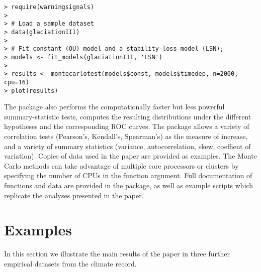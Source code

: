 \documentclass[authoryear, preprint,review,12pt]{elsarticle}
\begin{document}
\begin{verbatim}
> require(warningsignals)
>
> # Load a sample dataset
> data(glaciationIII)
>
> # Fit constant (OU) model and a stability-loss model (LSN);
> models <- fit_models(glaciationIII, 'LSN')
>
> results <- montecarlotest(models$const, models$timedep, n=2000, cpu=16)
> plot(results)
\end{verbatim}

The package also performs the computationally faster but less powerful summary-statistic tests, computes the resulting distributions under the different hypotheses and the corresponding ROC curves.  The package allows a variety of correlation tests (Pearson's, Kendall's, Spearman's) as the measure of increase, and a variety of summary statistics (variance, autocorrelation, skew, coeffient of variation).  Copies of data used in the paper are provided as examples.  The Monte Carlo methods can take advantage of multiple core processors or clusters by specifying the number of CPUs in the function argument.   Full documentation of functions and data are provided in the package, as well as example scripts which replicate the analyses presented in the paper.   

\section{Examples}\label{examples}
In this section we illustrate the main results of the paper in three further empirical datasets from the climate record.  


\pagebreak

\section*{ }%

\end{document}
